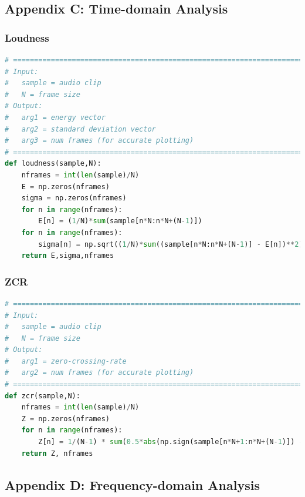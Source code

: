 \documentclass[11pt,a4paper]{article}
\begin{document}
\subsection{Appendix C: Time-domain Analysis} \label{app:timedomain}
	\subsubsection{Loudness} \label{app:loudness}
		\begin{lstlisting}[language=Python,label={lst:loudness}]
# =============================================================================
# Input:
#   sample = audio clip
#   N = frame size
# Output:
#   arg1 = energy vector
#   arg2 = standard deviation vector
#   arg3 = num frames (for accurate plotting)
# =============================================================================
def loudness(sample,N):
    nframes = int(len(sample)/N)
    E = np.zeros(nframes)
    sigma = np.zeros(nframes)
    for n in range(nframes):
        E[n] = (1/N)*sum(sample[n*N:n*N+(N-1)])
    for n in range(nframes):
        sigma[n] = np.sqrt((1/N)*sum((sample[n*N:n*N+(N-1)] - E[n])**2))
    return E,sigma,nframes
		\end{lstlisting}
	\subsubsection{ZCR} \label{app:zcr}
		\begin{lstlisting}[language=Python,label={lst:zcr}]
# =============================================================================
# Input:
#   sample = audio clip
#   N = frame size
# Output:
#   arg1 = zero-crossing-rate
#   arg2 = num frames (for accurate plotting)
# =============================================================================
def zcr(sample,N):
    nframes = int(len(sample)/N)
    Z = np.zeros(nframes)
    for n in range(nframes):
        Z[n] = 1/(N-1) * sum(0.5*abs(np.sign(sample[n*N+1:n*N+(N-1)]) - np.sign(sample[n*N:n*N+(N-2)])))
    return Z, nframes
		\end{lstlisting}

\pagebreak

	\subsection{Appendix D: Frequency-domain Analysis} \label{app:frequencydomain}
\end{document}
